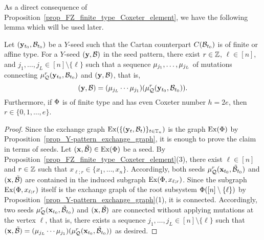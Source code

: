 As a direct consequence of Proposition~\ref{prop_FZ_finite_type_Coxeter_element}, we 
have the following lemma which will be used later. 
\begin{lemma}\label{lemma:normal form}
Let $(\mathbf{y}_{t_0}, \mathcal{B}_{t_0})$ be a $Y$-seed such that the Cartan counterpart $C(\mathcal{B}_{t_0})$ is of finite or affine type.
For a $Y$-seed $(\mathbf{y}, \mathcal{B})$ in the seed pattern, there exist $r \in\mathbb{Z}$, $\ell \in [n]$, and $j_1,\dots,j_{L} \in [n] \setminus \{\ell\}$ 
such that a sequence $\mu_{j_1},\dots,\mu_{j_L}$ of mutations 
connecting $\mu_{\mathcal{Q}}^r(\mathbf{y}_{t_0}, \mathcal{B}_{t_0})$ and $(\mathbf{y}, \mathcal{B})$, that is, 
\[
(\mathbf{y}, \mathcal{B}) = (\mu_{j_L} \cdots \mu_{j_1})(\mu_{\mathcal{Q}}^r(\mathbf{y}_{t_0}, \mathcal{B}_{t_0})).
\]
Furthermore, if $\Phi$ is of finite type and has even Coxeter number $h = 2e$, then $r \in \{0,1,\dots,e\}$.
\end{lemma}
\begin{proof}
Since the exchange graph $\operatorname{Ex}(\{(\mathbf{y}_t, \mathcal{B}_t)\}_{t\in \mathbb{T}_n})$ is the graph $\operatorname{Ex}(\Phi)$ by Proposition~\ref{prop_Y-pattern_exchange_graph}, it is enough to prove the claim in terms of seeds. Let $(\mathbf{x}, \mathcal{\tilde{B}}) \in \operatorname{Ex}(\Phi)$ be a seed. 
By Proposition~\ref{prop_FZ_finite_type_Coxeter_element}(3), there exist $\ell \in [n]$ and $r \in \mathbb{Z}$ such that 
$x_{\ell;r} \in \{x_1,\dots,x_n\}$. Accordingly, both seeds $\mu_{\mathcal{Q}}^r(\mathbf{x}_{t_0}, \mathcal{\tilde{B}}_{t_0})$ and $(\mathbf{x}, \mathcal{\tilde{B}})$ are contained in the induced subgraph $\operatorname{Ex}({\Phi},{x_{\ell;r}})$.
Since the subgraph $\operatorname{Ex}({\Phi},{x_{\ell;r}})$ itself is the exchange  graph of the root subsystem $\Phi([n] \setminus \{\ell\})$ by Proposition~\ref{prop_Y-pattern_exchange_graph}(1), it is connected. 
Accordingly, two seeds $\mu_{\mathcal{Q}}^r(\mathbf{x}_{t_0}, \mathcal{\tilde{B}}_{t_0})$ and  $(\mathbf{x}, \mathcal{\tilde{B}})$ are connected without applying mutations at the vertex $\ell$, that is, there exists a sequence $j_1,\dots,j_L \in [n] \setminus \{\ell\}$ such that $(\mathbf{x}, \mathcal{\tilde{B}}) = (\mu_{j_L} \cdots \mu_{j_1})(\mu_{\mathcal{Q}}^r(\mathbf{x}_{t_0}, \mathcal{\tilde{B}}_{t_0}))$ as desired. 
\end{proof}

